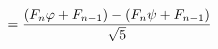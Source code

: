 \documentclass[preview]{standalone}
\begin{document}
\begin{align*}
\special{dvisvgm:raw <g id='unique000'>}= \frac{(F_n\varphi + F_{n-1}) - (F_n\psi + F_{n-1})}{\sqrt{5}}\special{dvisvgm:raw </g>}
\end{align*}
\end{document}
